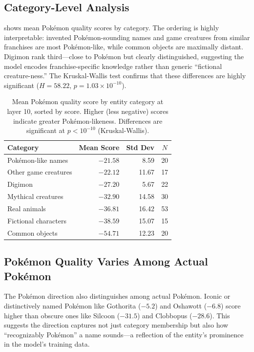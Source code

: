 \subsection{Category-Level Analysis}
\label{sec:categories}

 shows mean Pok\'{e}mon quality scores by category. The ordering is highly interpretable: invented Pok\'{e}mon-sounding names and game creatures from similar franchises are most Pok\'{e}mon-like, while common objects are maximally distant. Digimon rank third---close to Pok\'{e}mon but clearly distinguished, suggesting the model encodes franchise-specific knowledge rather than generic ``fictional creature-ness.'' The Kruskal-Wallis test confirms that these differences are highly significant ($H = 58.22$, $p = 1.03 \times 10^{-10}$).

\begin{table}[t]
    \centering
    \caption{Mean Pok\'{e}mon quality score by entity category at layer 10, sorted by score. Higher (less negative) scores indicate greater Pok\'{e}mon-likeness. Differences are significant at $p < 10^{-10}$ (Kruskal-Wallis).}
    \label{tab:categories}
    \begin{tabular}{@{}lrrc@{}}
        \toprule
        Category & Mean Score & Std Dev & $N$ \\
        \midrule
        Pok\'{e}mon-like names  & $-21.58$ & 8.59  & 20 \\
        Other game creatures    & $-22.12$ & 11.67 & 17 \\
        Digimon                 & $-27.20$ & 5.67  & 22 \\
        Mythical creatures      & $-32.90$ & 14.58 & 30 \\
        Real animals            & $-36.81$ & 16.42 & 53 \\
        Fictional characters    & $-38.59$ & 15.07 & 15 \\
        Common objects          & $-54.71$ & 12.23 & 20 \\
        \bottomrule
    \end{tabular}
\end{table}

\subsection{Pok\'{e}mon Quality Varies Among Actual Pok\'{e}mon}
\label{sec:within_pokemon}

The Pok\'{e}mon direction also distinguishes among actual Pok\'{e}mon. Iconic or distinctively named Pok\'{e}mon like Gothorita ($-5.2$) and Oshawott ($-6.8$) score higher than obscure ones like Silcoon ($-31.5$) and Clobbopus ($-28.6$). This suggests the direction captures not just category membership but also how ``recognizably Pok\'{e}mon'' a name sounds---a reflection of the entity's prominence in the model's training data.